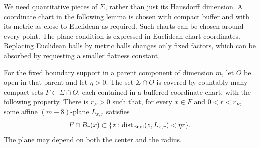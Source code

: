 We need quantitative pieces of $\Sigma$, rather than just its
Hausdorff dimension.  A coordinate chart in the following lemma is
chosen with compact buffer and with its metric as close to Euclidean
as required.  Such charts can be chosen around every point.  The plane
condition is expressed in Euclidean chart coordinates.  Replacing
Euclidean balls by metric balls changes only fixed factors, which can
be absorbed by requesting a smaller flatness constant.

\begin{lemma}\label{local:plane-containment-pieces}
For the fixed boundary support in a parent component of dimension $m$, let
$O$ be open in that parent and let $\eta>0$.
The set $\Sigma\cap O$ is covered by countably many compact sets
$F\subset\Sigma\cap O$, each contained in a buffered coordinate chart,
with the following property.  There is $r_F>0$ such that, for every
$x\in F$ and $0<r<r_F$, some affine $(m-8)$-plane $L_{x,r}$ satisfies
\begin{equation}\label{local:plane-containment}
 F\cap B_r(x)\subset\{z:\operatorname{dist}_{\rm Eucl}(z,L_{x,r})<\eta r\}.
\end{equation}
The plane may depend on both the center and the radius.
\end{lemma}
